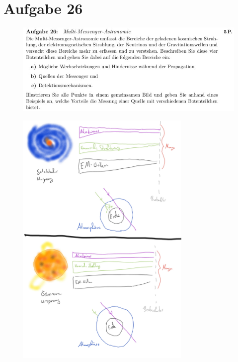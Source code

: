 \section{Aufgabe 26}
\begin{figure}[H]
    \centering
    \includegraphics[width=\textwidth]{images/ex26.jpg}
\end{figure}

\begin{figure}[H]
    \centering
    \includegraphics[width=0.75\textwidth]{images/Messenger.jpg}
\end{figure}



